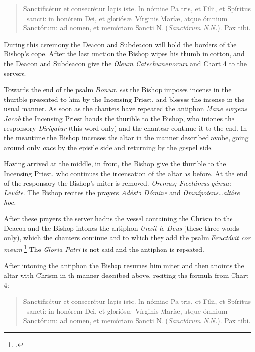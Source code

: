 \documentclass[letterpaper]{report}
\begin{document}
{\begin{quote}
    Sancti\cross ficétur et conse\cross crétur lapis iste. In nómine Pa\cross
    tris, et Fí\cross lii, et Spíritus \cross\ sancti: in honórem Dei, et
    gloriós\ae\ Vírginis Marí\ae, atque ómnium Sanctórum: ad nomen, et memóriam
    Sancti N. (\textit{Sanctórum N.N.}). Pax tibi.
\end{quote}

During this ceremony the Deacon and Subdeacon will hold the borders of the
Bishop's cope. After the last unction the Bishop wipes his thumb in cotton, and
the Deacon and Subdeacon give the \textit{Oleum Catechumenorum} and Chart 4 to
the servers.

\rubric Towards the end of the psalm \textit{Bonum est} the Bishop imposes
incense in the thurible presented to him by the Incensing Priest, and blesses
the incense in the usual manner. As soon as the chanters have repeated the
antiphon \textit{Mane surgens Jacob} the Incensing Priest hands the thurible to
the Bishop, who intones the responsory \textit{Dirigatur} (this word only) and
the chantesr continue it to the end. In the meantime the Bishop incenses the
altar in the manner described avobe, going around only \textit{once} by the
epistle side and returning by the gospel side.

\rubric Having arrived at the middle, in front, the Bishop give the thurible to
the Incensing Priest, who continues the incensation of the altar as before. At
the end of the responsory the Bishop's miter is removed. \textit{Orémus;
Flectámus génua; Leváte.} The Bishop recites the prayers \textit{Adésto Dómine}
and \textit{Omnípotens\dots altáre hoc.}

\rubric After these prayers the server hadns the vessel containing the Chrism
to the Deacon and the Bishop intones the antiphon \textit{Unxit te Deus} (these
three words only), which the chanters continue and to which they add the psalm
\textit{Eructávit cor meum.}\footcite[The antiphon \textit{Unxit te Deus} may
be repested after each verse of this psalm.][footnote 1, p. 104.]{consecranda}
The \textit{Gloria Patri} is not said and the antiphon is repeated.

After intoning the antiphon the Bishop resumes him miter and then anoints the
altar with Chrism in th manner described above, reciting the formula from Chart
4:

\begin{quote}
    Sancti\cross ficétur et conse\cross crétur lapis iste. In nómine Pa\cross
    tris, et Fí\cross lii, et Spíritus \cross\ sancti: in honórem Dei, et
    gloriós\ae\ Vírginis Marí\ae, atque ómnium Sanctórum: ad nomen, et memóriam
    Sancti N. (\textit{Sanctórum N.N.}). Pax tibi.
\end{quote}

}
\end{document}
